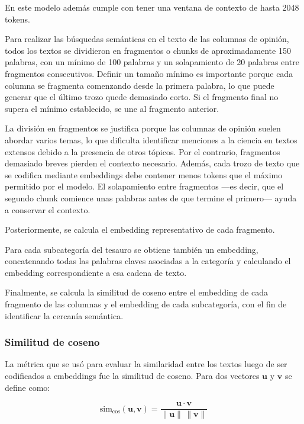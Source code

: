\documentclass[11pt,a4paper]{article}
\begin{document}
	En este modelo además cumple con tener una ventana de contexto de hasta 2048 tokens. 
	
	
	Para realizar las búsquedas semánticas en el texto de las columnas de opinión, todos los textos se dividieron en fragmentos o chunks de aproximadamente 150 palabras, con un mínimo de 100 palabras y un solapamiento de 20 palabras entre fragmentos consecutivos. Definir un tamaño mínimo es importante porque cada columna se fragmenta comenzando desde la primera palabra, lo que puede generar que el último trozo quede demasiado corto. Si el fragmento final no supera el mínimo establecido, se une al fragmento anterior.
	
	La división en fragmentos se justifica porque las columnas de opinión suelen abordar varios temas, lo que dificulta identificar menciones a la ciencia en textos extensos debido a la presencia de otros tópicos. Por el contrario, fragmentos demasiado breves pierden el contexto necesario. Además, cada trozo de texto que se codifica mediante embeddings debe contener menos tokens que el máximo permitido por el modelo. El solapamiento entre fragmentos —es decir, que el segundo chunk comience unas palabras antes de que termine el primero— ayuda a conservar el contexto.
	
	Posteriormente, se calcula el embedding representativo de cada fragmento.
	
	Para cada subcategoría del tesauro se obtiene también un embedding, concatenando todas las palabras claves asociadas a la categoría y calculando el embedding correspondiente a esa cadena de texto.
	
	Finalmente, se calcula la similitud de coseno entre el embedding de cada fragmento de las columnas y el embedding de cada subcategoría, con el fin de identificar la cercanía semántica.
	
	\subsubsection{Similitud de coseno}
	
	La métrica que se usó para evaluar la similaridad entre los textos luego de ser codificados a embeddings fue la similitud de coseno. Para dos vectores $\mathbf{u}$ y $\mathbf{v}$ se define como:
	
	\begin{equation}
		\text{sim}_{\cos}(\mathbf{u}, \mathbf{v}) = 
		\frac{\mathbf{u} \cdot \mathbf{v}}
		{\|\mathbf{u}\| \, \|\mathbf{v}\|}
	\end{equation}
	
\end{document}
